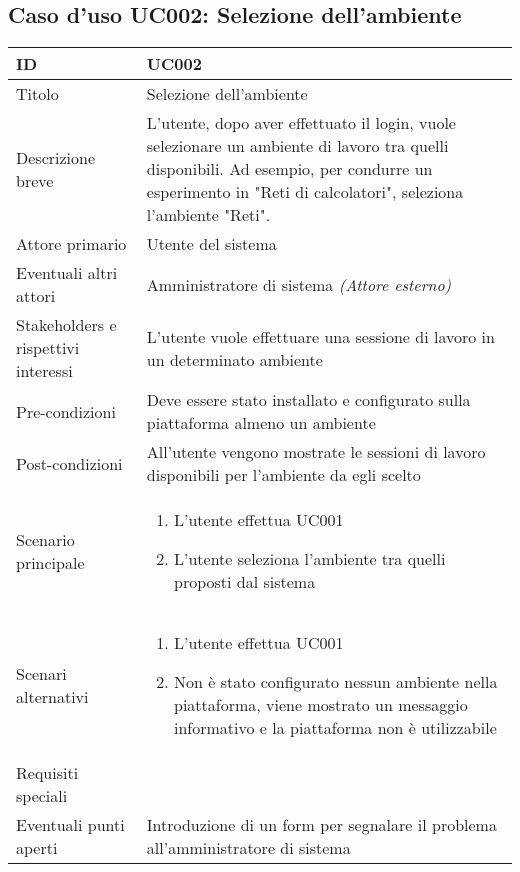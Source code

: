 \documentclass[../../main.tex]{subfiles}
\begin{document}
\subsection{Caso d’uso UC002: Selezione dell'ambiente }
\begin{tabularx}{150mm}{|l|X|}
    \hline
    ID                                  & \textbf{UC002}\\
    \hline
    Titolo                              & Selezione dell'ambiente \\
    \hline
    Descrizione breve                   & L'utente, dopo aver effettuato il login, vuole selezionare un ambiente di lavoro tra quelli disponibili. Ad esempio, per condurre un esperimento in "Reti di calcolatori", seleziona l'ambiente "Reti".   \\
    \hline
    Attore primario                     & Utente del sistema
    \\
    \hline
    Eventuali altri attori              & Amministratore di sistema \textit{(Attore esterno)}   \\
    \hline
    Stakeholders e rispettivi interessi & L'utente vuole effettuare una sessione di lavoro in un determinato ambiente   \\
    \hline
    Pre-condizioni                      & Deve essere stato installato e configurato sulla piattaforma almeno un ambiente   \\
    \hline
    Post-condizioni                     & All'utente vengono mostrate le sessioni di lavoro disponibili per l'ambiente da egli scelto  \\
    \hline
    Scenario principale                 & \begin{enumerate}
        \item L'utente effettua UC001
        \item L'utente seleziona l'ambiente tra quelli proposti dal sistema
    \end{enumerate}
            \\
    \hline
    Scenari alternativi                 & \begin {enumerate}
        \item L'utente effettua UC001
        \item Non è stato configurato nessun ambiente nella piattaforma, viene mostrato un messaggio informativo e la piattaforma non è utilizzabile
        \end{enumerate}
            \\
    \hline
    Requisiti speciali                  &    \\
    \hline
    Eventuali punti aperti              &    Introduzione di un form per segnalare il problema all'amministratore di sistema \\
    \hline
\end{tabularx}
\newpage
\end{document}
